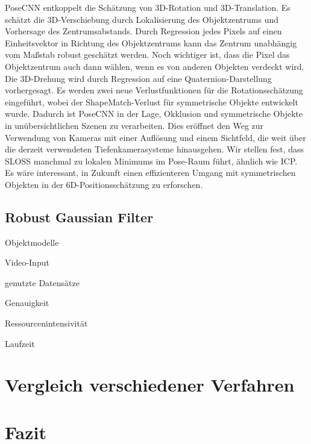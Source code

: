 \documentclass[a4paper, 11pt]{article}
\begin{document}
\begin{multicols*}{2}
    PoseCNN entkoppelt die Schätzung von 3D-Rotation und 3D-Translation. Es schätzt die 3D-Verschiebung durch Lokalisierung des Objektzentrums und Vorhersage des Zentrumsabstands. Durch Regression jedes Pixels auf einen Einheitsvektor in Richtung des Objektzentrums kann das Zentrum unabhängig vom Maßstab robust geschätzt werden. Noch wichtiger ist, dass die Pixel das Objektzentrum auch dann wählen, wenn es von anderen Objekten verdeckt wird. Die 3D-Drehung wird durch Regression auf eine Quaternion-Darstellung vorhergesagt. Es werden zwei neue Verlustfunktionen für die Rotationsschätzung eingeführt, wobei der ShapeMatch-Verlust für symmetrische Objekte entwickelt wurde. Dadurch ist PoseCNN in der Lage, Okklusion und symmetrische Objekte in unübersichtlichen Szenen zu verarbeiten. Dies eröffnet den Weg zur Verwendung von Kameras mit einer Auflösung und einem Sichtfeld, die weit über die derzeit verwendeten Tiefenkamerasysteme hinausgehen. Wir stellen fest, dass SLOSS manchmal zu lokalen Minimums im Pose-Raum führt, ähnlich wie ICP. Es wäre interessant, in Zukunft einen effizienteren Umgang mit symmetrischen Objekten in der 6D-Positionsschätzung zu erforschen.

    \subsection{Robust Gaussian Filter\cite{GaussianFilter}}
    \begin{description*}
        \item[Objektmodelle]
        \item[Video-Input]
        \item[genutzte Datensätze]
        \item[Genauigkeit]
        \item[Ressourcenintensivität]
        \item[Laufzeit]
    \end{description*}

    \section{Vergleich verschiedener Verfahren}

    \section{Fazit}

\end{multicols*}

\medskip

\printglossary[title=Glossar]

\printbibliography[title=Literatur]
\end{document}
